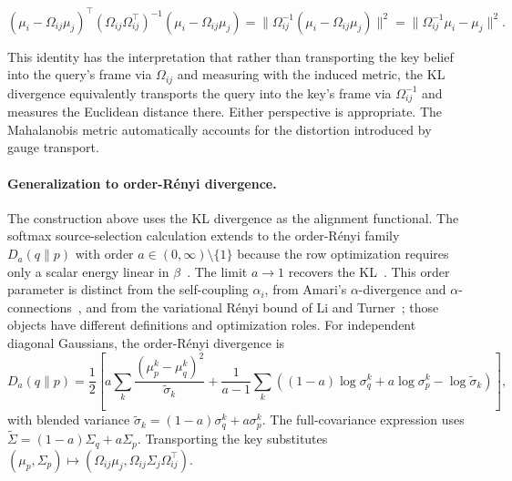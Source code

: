\documentclass[twoside,11pt]{article}
\begin{document}
\begin{equation}
(\mu_i - \Omega_{ij}\mu_j)^\top(\Omega_{ij}\Omega_{ij}^\top)^{-1}(\mu_i - \Omega_{ij}\mu_j) = \|\Omega_{ij}^{-1}(\mu_i - \Omega_{ij}\mu_j)\|^2 = \|\Omega_{ij}^{-1}\mu_i - \mu_j\|^2.
\label{eq:mahalanobis_identity}
\end{equation}

This identity has the interpretation that rather than transporting the key belief into the query's frame via $\Omega_{ij}$ and measuring with the induced metric, the KL divergence equivalently transports the query into the key's frame via $\Omega_{ij}^{-1}$ and measures the Euclidean distance there. Either perspective is appropriate. The Mahalanobis metric automatically accounts for the distortion introduced by gauge transport.

\paragraph{Generalization to order-R\'enyi divergence.}

The construction above uses the KL divergence as the alignment functional. The softmax source-selection calculation extends to the order-R\'enyi family $D_a(q\|p)$ with order $a\in(0,\infty)\setminus\{1\}$ because the row optimization requires only a scalar energy linear in $\beta$~\citep{vanErvenHarremoes2014}. The limit $a\to1$ recovers the KL~\citep{vanErvenHarremoes2014}. This order parameter is distinct from the self-coupling $\alpha_i$, from Amari's $\alpha$-divergence and $\alpha$-connections~\citep{Amari2016}, and from the variational R\'enyi bound of Li and Turner~\citep{LiTurner2016RenyiVI}; those objects have different definitions and optimization roles. For independent diagonal Gaussians, the order-R\'enyi divergence is
\begin{equation}
D_a(q \| p) = \frac{1}{2}\left[ a \sum_k \frac{(\mu_p^k - \mu_q^k)^2}{\tilde\sigma_k} + \frac{1}{a - 1} \sum_k \left((1-a)\log \sigma_q^k + a \log \sigma_p^k - \log \tilde\sigma_k\right) \right],
\label{eq:renyi_diagonal}
\end{equation}
with blended variance $\tilde\sigma_k=(1-a)\sigma_q^k+a\sigma_p^k$. The full-covariance expression uses $\tilde\Sigma=(1-a)\Sigma_q+a\Sigma_p$. Transporting the key substitutes $(\mu_p,\Sigma_p)\mapsto(\Omega_{ij}\mu_j,\Omega_{ij}\Sigma_j\Omega_{ij}^\top)$.
\end{document}
